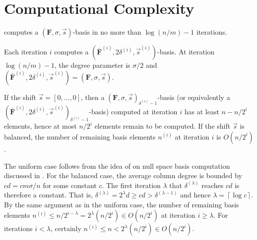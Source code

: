 
\section{Computational Complexity}

\label{sec:complexity}

%
\begin{comment}
In this section, we analyze the computational complexity of Algorithm
\prettyref{alg:mab}. 
\end{comment}
{} 
\begin{lem}
 computes a $\left(\mathbf{F},\sigma,\vec{s}\right)$-basis
in no more than $\log\left(n/m\right)-1$ iterations.\end{lem}
\begin{pf}
Each iteration $i$ computes a $(\bar{\mathbf{F}}^{\left(i\right)},2\delta^{\left(i\right)},\vec{s}^{\left(i\right)})$-basis.
At iteration $\log\left(n/m\right)-1$, the degree parameter is $\sigma/2$
and $(\bar{\mathbf{F}}^{\left(i\right)},2\delta^{\left(i\right)},\vec{s}^{\left(i\right)})=\left(\mathbf{F},\sigma,\vec{s}\right)$.\end{pf}
\begin{lem}
\label{lem:remainingNumberElements}If the shift $\vec{s}=\left[0,\dots,0\right]$,
then a $\left(\mathbf{F},\sigma,\vec{s}\right)_{\delta^{\left(i\right)}-1}$-basis
(or equivalently a $(\bar{\mathbf{F}}^{\left(i\right)},2\delta^{\left(i\right)},\vec{s}^{\left(i\right)})_{\delta^{\left(i\right)}-1}$-basis)
computed at iteration $i$ has at least $n-n/2^{i}$ elements, hence
at most $n/2^{i}$ elements remain to be computed. If the shift $\vec{s}$
is balanced, the number of remaining basis elements $n^{\left(i\right)}$
at iteration $i$ is $O(n/2^{i})$.\end{lem}
\begin{pf}
The uniform case follows from the idea of \citet{storjohann-villard:2005}
on null space basis computation discussed in .
For the balanced case, the average column degree is bounded by $cd=cm\sigma/n$
for some constant $c$. The first iteration $\lambda$ that $\delta^{\left(\lambda\right)}$
reaches $cd$ is therefore a constant. That is, $\delta^{\left(\lambda\right)}=2^{\lambda}d\ge cd>\delta^{\left(\lambda-1\right)}$
and hence $\lambda=\left\lceil \log c\right\rceil $. By the same
argument as in the uniform case, the number of remaining basis elements
$n^{\left(i\right)}\le n/2^{i-\lambda}=2^{\lambda}(n/2^{i})\in O(n/2^{i})$
at iteration $i\ge\lambda$. For iterations $i<\lambda$, certainly
$n^{\left(i\right)}\le n<2^{\lambda}(n/2^{i})\in O(n/2^{i})$.\end{pf}
